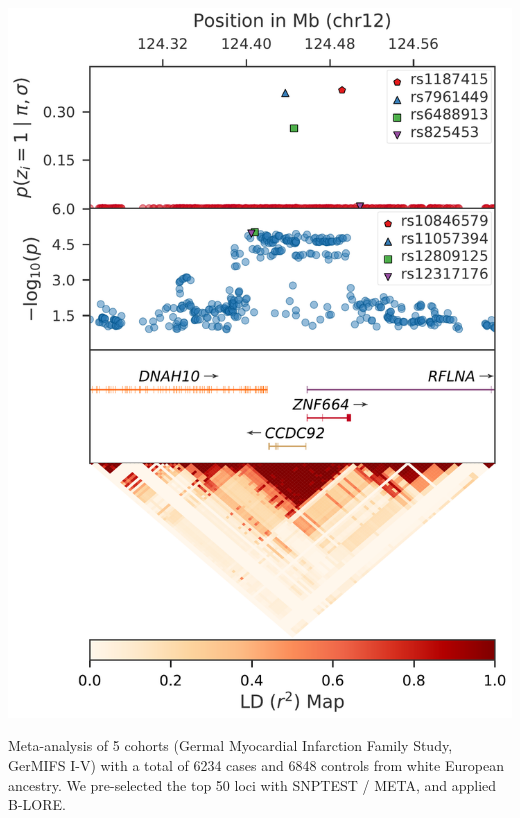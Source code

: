 \documentclass[a0paper,portrait,debug]{baposter}
\begin{document}
\begin{poster}
{\begin{center}
    \includegraphics[height=\myfigheight, keepaspectratio]{Locus_013.pdf}
  \end{center}
Meta-analysis of 5 cohorts (Germal Myocardial Infarction Family Study, GerMIFS I-V) with a total of 6234 cases and 6848 controls from white European ancestry. 
We pre-selected the top 50 loci with SNPTEST / META, and applied B-LORE.
}


\end{poster}
\end{document}
